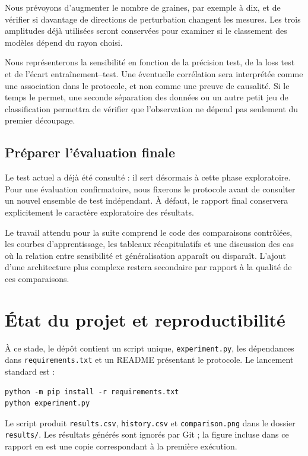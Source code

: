 \documentclass[11pt,a4paper]{article}
\begin{document}
Nous prévoyons d'augmenter le nombre de graines, par exemple à dix, et de vérifier si davantage de directions de perturbation changent les mesures. Les trois amplitudes déjà utilisées seront conservées pour examiner si le classement des modèles dépend du rayon choisi.

Nous représenterons la sensibilité en fonction de la précision test, de la loss test et de l'écart entraînement--test. Une éventuelle corrélation sera interprétée comme une association dans le protocole, et non comme une preuve de causalité. Si le temps le permet, une seconde séparation des données ou un autre petit jeu de classification permettra de vérifier que l'observation ne dépend pas seulement du premier découpage.

\subsection{Préparer l'évaluation finale}

Le test actuel a déjà été consulté : il sert désormais à cette phase exploratoire. Pour une évaluation confirmatoire, nous fixerons le protocole avant de consulter un nouvel ensemble de test indépendant. À défaut, le rapport final conservera explicitement le caractère exploratoire des résultats.

Le travail attendu pour la suite comprend le code des comparaisons contrôlées, les courbes d'apprentissage, les tableaux récapitulatifs et une discussion des cas où la relation entre sensibilité et généralisation apparaît ou disparaît. L'ajout d'une architecture plus complexe restera secondaire par rapport à la qualité de ces comparaisons.

\section{État du projet et reproductibilité}

À ce stade, le dépôt contient un script unique, \texttt{experiment.py}, les dépendances dans \texttt{requirements.txt} et un README présentant le protocole. Le lancement standard est :
\begin{verbatim}
python -m pip install -r requirements.txt
python experiment.py
\end{verbatim}

Le script produit \texttt{results.csv}, \texttt{history.csv} et \texttt{comparison.png} dans le dossier \texttt{results/}. Les résultats générés sont ignorés par Git ; la figure incluse dans ce rapport en est une copie correspondant à la première exécution.
\end{document}
